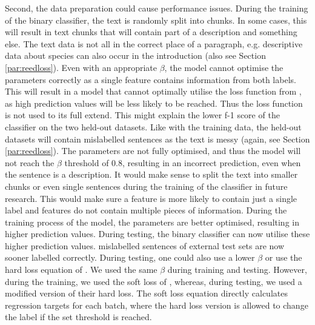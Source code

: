 \documentclass[a4paper, 12pt, oneside]{book} %
\begin{document}
Second, the data preparation could cause performance issues.
During the training of the binary classifier, the text is randomly split into chunks. 
In some cases, this will result in text chunks that will contain part of a description and something else.
The text data is not all in the correct place of a paragraph, e.g. descriptive data about species can also occur in the introduction (also see Section \ref{par:reedloss}).
Even with an appropriate \(\beta\), the model cannot optimise the parameters correctly as a single feature contains information from both labels.
This will result in a model that cannot optimally utilise the loss function from \textcite{reed_training_2015}, as high prediction values will be less likely to be reached.
Thus the loss function is not used to its full extend.
This might explain the lower f-1 score of the classifier on the two held-out datasets.
Like with the training data, the held-out datasets will contain mislabelled sentences as the text is messy (again, see Section \ref{par:reedloss}).
The parameters are not fully optimised, and thus the model will not reach the \(\beta\) threshold of 0.8, resulting in an incorrect prediction, even when the sentence is a description.
It would make sense to split the text into smaller chunks or even single sentences during the training of the classifier in future research.
This would make sure a feature is more likely to contain just a single label and features do not contain multiple pieces of information.
During the training process of the model, the parameters are better optimised, resulting in higher prediction values.
During testing, the binary classifier can now utilise these higher prediction values.
mislabelled sentences of external test sets are now sooner labelled correctly.
During testing, one could also use a lower \(\beta\) or use the hard loss equation of \textcite{reed_training_2015}.
We used the same \(\beta\) during training and testing.
However, during the training, we used the soft loss of \textcite{reed_training_2015}, whereas, during testing, we used a modified version of their hard loss.
The soft loss equation directly calculates regression targets for each batch, where the hard loss version is allowed to change the label if the set threshold is reached.
\end{document}
